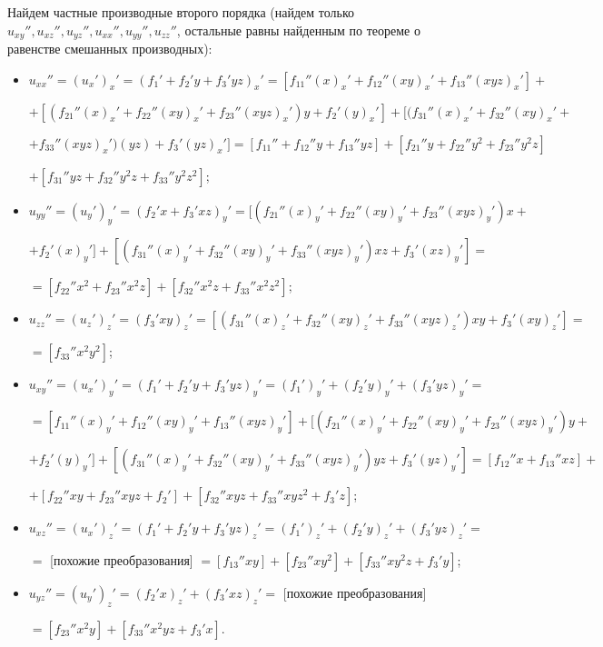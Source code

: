 \documentclass{article}
\begin{document}
Найдем частные производные второго порядка (найдем только $u_{xy}'', u_{xz}'', u_{yz}'', u_{xx}'', u_{yy}'', u_{zz}''$, остальные равны найденным по теореме о равенстве смешанных производных):
\begin{itemize}
\item $u_{xx}'' = (u_x')_x' = (f_1' + f_2'y + f_3'yz)_x' = [f_{11}''(x)_x' + f_{12}''(xy)_x' + f_{13}''(xyz)_x']+$\vspace{1mm}

$+[(f_{21}''(x)_x' + f_{22}''(xy)_x' + f_{23}''(xyz)_x')y + f_2'(y)_x']+[(f_{31}''(x)_x' + f_{32}''(xy)_x' +$\vspace{1mm}

$+ f_{33}''(xyz)_x')(yz) + f_3'(yz)_x'] = [f_{11}'' + f_{12}''y+ f_{13}''yz]+[f_{21}''y + f_{22}''y^2 + f_{23}''y^2z]$\vspace{1mm}

$+[f_{31}''yz + f_{32}''y^2z + f_{33}''y^2z^2]$;

\item $u_{yy}'' = (u_y')_y' = (f_2'x + f_3'xz)_y' = [(f_{21}''(x)_y' + f_{22}''(xy)_y' + f_{23}''(xyz)_y')x +$\vspace{1mm}

$+f_2'(x)_y']+[(f_{31}''(x)_y' + f_{32}''(xy)_y' + f_{33}''(xyz)_y')xz + f_3'(xz)_y'] =$\vspace{1mm}

$=[f_{22}''x^2 + f_{23}''x^2z]+[f_{32}''x^2z + f_{33}''x^2z^2]$;

\item $u_{zz}'' = (u_z')_z' = (f_3'xy)_z' = [(f_{31}''(x)_z' + f_{32}''(xy)_z' + f_{33}''(xyz)_z')xy + f_3'(xy)_z'] =$\vspace{1mm}

$=[f_{33}''x^2y^2]$;

\item $u_{xy}'' = (u_x')_y' = (f_1' + f_2'y + f_3'yz)_y' = (f_1')_y' + (f_2'y)_y' + (f_3'yz)_y' =$
\vspace{1mm}

$= [f_{11}''(x)_y' + f_{12}''(xy)_y' + f_{13}''(xyz)_y'] + [(f_{21}''(x)_y' + f_{22}''(xy)_y' + f_{23}''(xyz)_y')y+$\vspace{1mm}

$+f_2'(y)_y'] + [(f_{31}''(x)_y' + f_{32}''(xy)_y' + f_{33}''(xyz)_y')yz+f_3'(yz)_y']=[ f_{12}''x + f_{13}''xz]+$\vspace{1mm}

$+[f_{22}''xy+ f_{23}''xyz + f_2'] + [f_{32}''xyz + f_{33}''xyz^2+f_3'z]$;

\item $u_{xz}'' = (u_x')_z' = (f_1' + f_2'y + f_3'yz)_z' = (f_1')_z' + (f_2'y)_z' + (f_3'yz)_z' =$
\vspace{1mm}

$=$ [похожие преобразования] $= [f_{13}''xy] + [f_{23}''xy^2] + [f_{33}''xy^2z+f_3'y]$;

\item $u_{yz}'' = (u_y')_z' = (f_2'x)_z' + (f_3'xz)_z' = $ [похожие преобразования] 
\vspace{1mm}

$=[f_{23}''x^2y]+[f_{33}''x^2yz+f_3'x]$.
\end{itemize}
\vspace{3mm}
\end{document}
